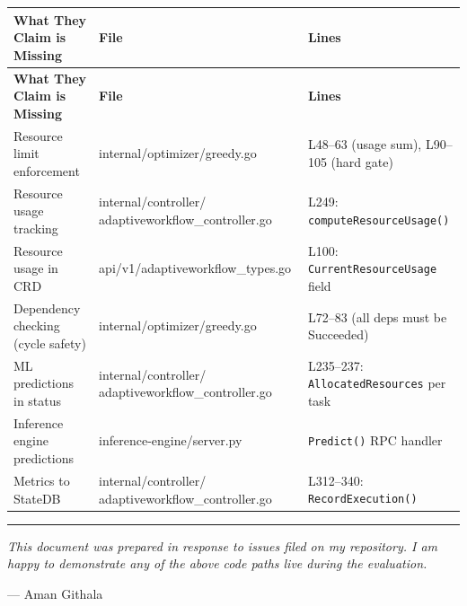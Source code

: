 \documentclass[12pt,a4paper]{article}
\begin{document}
\renewcommand{\arraystretch}{1.4}
\begin{longtable}{
  >{\raggedright\arraybackslash}p{4.5cm}
  >{\raggedright\ttfamily\small\arraybackslash}p{5.5cm}
  >{\raggedright\arraybackslash}p{4cm}}
\toprule
\textbf{What They Claim is Missing} & \textnormal{\textbf{File}} & \textbf{Lines} \\
\midrule
\endfirsthead

\toprule
\textbf{What They Claim is Missing} & \textnormal{\textbf{File}} & \textbf{Lines} \\
\midrule
\endhead

Resource limit enforcement &
internal/optimizer/greedy.go &
L48--63 (usage sum), L90--105 (hard gate) \\
\midrule

Resource usage tracking &
internal/controller/ adaptiveworkflow\_controller.go &
L249: \textnormal{\texttt{computeResourceUsage()}} \\
\midrule

Resource usage in CRD &
api/v1/adaptiveworkflow\_types.go &
L100: \textnormal{\texttt{CurrentResourceUsage}} field \\
\midrule

Dependency checking (cycle safety) &
internal/optimizer/greedy.go &
L72--83 (all deps must be Succeeded) \\
\midrule

ML predictions in status &
internal/controller/ adaptiveworkflow\_controller.go &
L235--237: \textnormal{\texttt{AllocatedResources}} per task \\
\midrule

Inference engine predictions &
inference-engine/server.py &
\textnormal{\texttt{Predict()}} RPC handler \\
\midrule

Metrics to StateDB &
internal/controller/ adaptiveworkflow\_controller.go &
L312--340: \textnormal{\texttt{RecordExecution()}} \\
\bottomrule
\end{longtable}

\vspace{1cm}

\begin{center}
\rule{0.8\textwidth}{0.5pt}

\vspace{0.5cm}
\textit{This document was prepared in response to issues filed on my repository. I am happy to demonstrate any of the above code paths live during the evaluation.}

\vspace{0.3cm}
--- Aman Githala
\end{center}
\end{document}
